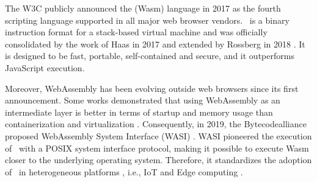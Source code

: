 \msection{\Wasm}
\label{sota:wasm}

The W3C publicly announced the \Wasm(Wasm) language in 2017 as the fourth scripting language supported in all major web browser vendors.
\wasm\ is a binary instruction format for a stack-based virtual machine and was officially consolidated by the work of Haas \etal \cite{Haas_2017} in 2017 and extended by Rossberg \etal in 2018 \cite{10.1145/3282510}. 
It is designed to be fast, portable, self-contained and secure, and it outperforms JavaScript execution. 

Moreover, WebAssembly has been evolving outside web browsers since its first announcement.
Some works demonstrated that using WebAssembly as an intermediate layer is better in terms of startup and memory usage than containerization and virtualization \cite{pMendkiServerless, 1244493Jacobsson}. 
Consequently, in 2019, the Bytecodealliance proposed WebAssembly System Interface (WASI) \cite{WASI}. 
WASI pioneered the execution of \wasm\ with a POSIX system interface protocol, making it possible to execute Wasm closer to the underlying operating system. 
Therefore, it standardizes the adoption of \wasm\ in heterogeneous platforms \cite{bryant2020webassembly}, i.e., IoT and Edge computing \cite{9640153, wen2020wasmachine}.

